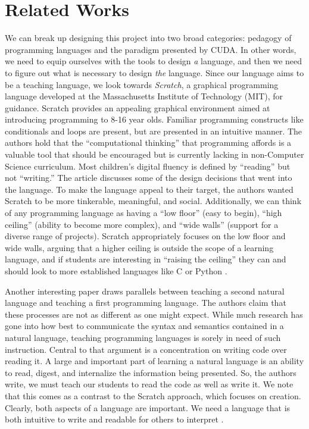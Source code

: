 \documentclass{article}
\begin{document}
\section{Related Works}

We can break up designing this project into two broad categories: pedagogy of programming languages and the paradigm presented by CUDA. In other words, we need to equip ourselves with the tools to design {\em a} language, and then we need to figure out what is necessary to design {\em the} language. Since our language aims to be a teaching language, we look towards {\em Scratch}, a graphical programming language developed at the Massachusetts Institute of Technology (MIT), for guidance. Scratch provides an appealing graphical environment aimed at introducing programming to 8-16 year olds. Familiar programming constructs like conditionals and loops are present, but are presented in an intuitive manner. The authors hold that the ``computational thinking'' that programming affords is a valuable tool that should be encouraged but is currently lacking in non-Computer Science curriculum. Most children's digital fluency is defined by ``reading'' but not ``writing.'' The article discusses some of the design decisions that went into the language. To make the language appeal to their target, the authors wanted Scratch to be more tinkerable, meaningful, and social. Additionally, we can think of any programming language as having a ``low floor'' (easy to begin), ``high ceiling'' (ability to become more complex), and ``wide walls'' (support for a diverse range of projects). Scratch appropriately focuses on the low floor and wide walls, arguing that a higher ceiling is outside the scope of a learning language, and if students are interesting in ``raising the ceiling'' they can and should look to more established languages like C or Python \cite{resnick}.

Another interesting paper draws parallels between teaching a second natural language and teaching a first programming language. The authors claim that these processes are not as different as one might expect. While much research has gone into how best to communicate the syntax and semantics contained in a natural language, teaching programming languages is sorely in need of such instruction. Central to that argument is a concentration on writing code over reading it. A large and important part of learning a natural language is an ability to read, digest, and internalize the information being presented. So, the authors write, we must teach our students to read the code as well as write it. We note that this comes as a contrast to the Scratch approach, which focuses on creation. Clearly, both aspects of a language are important. We need a language that is both intuitive to write and readable for others to interpret \cite{robertson}.
\end{document}
